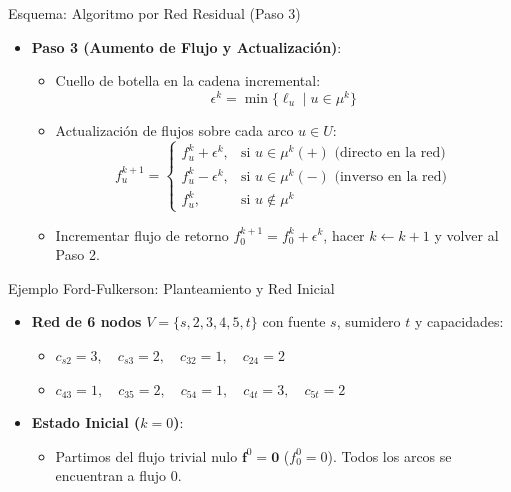 \documentclass[
  ignorenonframetext,
]{beamer}
\providecommand{\tightlist}{%
  \setlength{\itemsep}{0pt}\setlength{\parskip}{0pt}}
\begin{document}
\begin{frame}{Esquema: Algoritmo por Red Residual (Paso 3)}
\label{esquema-algoritmo-por-red-residual-paso-3}
\begin{itemize}
\tightlist
\item
  \textbf{Paso 3 (Aumento de Flujo y Actualización)}:

  \begin{itemize}
  \tightlist
  \item
    Cuello de botella en la cadena incremental:
    \[\epsilon^k = \min \{\ell_u \mid u \in \mu^k\}\]
  \item
    Actualización de flujos sobre cada arco \(u \in U\):
    \[f_u^{k+1} = \begin{cases} f_u^k + \epsilon^k, & \text{si } u \in \mu^k(+) \text{ (directo en la red)} \\ f_u^k - \epsilon^k, & \text{si } u \in \mu^k(-) \text{ (inverso en la red)} \\ f_u^k, & \text{si } u \notin \mu^k \end{cases}\]
  \item
    Incrementar flujo de retorno \(f_0^{k+1} = f_0^k + \epsilon^k\),
    hacer \(k \leftarrow k+1\) y volver al Paso 2.
  \end{itemize}
\end{itemize}
\end{frame}

\begin{frame}{Ejemplo Ford-Fulkerson: Planteamiento y Red Inicial}
\label{ejemplo-ford-fulkerson-planteamiento-y-red-inicial}
\begin{itemize}
\tightlist
\item
  \textbf{Red de 6 nodos} \(V = \{s, 2, 3, 4, 5, t\}\) con fuente \(s\),
  sumidero \(t\) y capacidades:

  \begin{itemize}
  \tightlist
  \item
    \(c_{s2}=3, \quad c_{s3}=2, \quad c_{32}=1, \quad c_{24}=2\)
  \item
    \(c_{43}=1, \quad c_{35}=2, \quad c_{54}=1, \quad c_{4t}=3, \quad c_{5t}=2\)
  \end{itemize}
\item
  \textbf{Estado Inicial (\(k=0\))}:

  \begin{itemize}
  \tightlist
  \item
    Partimos del flujo trivial nulo \(\mathbf{f}^0 = \mathbf{0}\)
    (\(f_0^0 = 0\)). Todos los arcos se encuentran a flujo 0.
  \end{itemize}
\end{itemize}
\end{frame}
\end{document}
